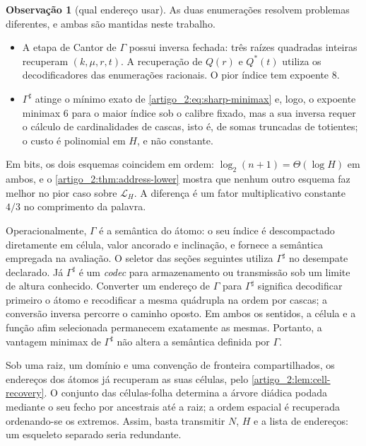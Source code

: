 \documentclass[12pt,a4paper]{article}
\theoremstyle{preciso}
\theoremstyle{definition}
\newcommand{\Library}{\mathcal{L}}
\theoremstyle{preciso}
\theoremstyle{preciso}
\theoremstyle{preciso}
\theoremstyle{preciso}
\theoremstyle{definition}
\theoremstyle{preciso}
\theoremstyle{definition}
\newtheorem{remark}[teorema]{Observação}
\theoremstyle{preciso}
\theoremstyle{preciso}
\theoremstyle{definition}
\begin{document}
\begin{remark}[qual endereço usar]\label{map:artigo_2:3.8}\label{artigo_2:rem:which-address}
As duas enumerações resolvem problemas diferentes, e ambas são mantidas neste trabalho.
\begin{itemize}[leftmargin=1.6em]
 \item A etapa de Cantor de $\Gamma$ possui inversa fechada: três raízes quadradas inteiras recuperam $(k,\mu,r,t)$. A recuperação de $Q(r)$ e $Q^*(t)$ utiliza os decodificadores das enumerações racionais. O pior índice tem expoente $8$.
 \item $\Gamma^\sharp$ atinge o mínimo exato de \eqref{artigo_2:eq:sharp-minimax} e, logo, o expoente minimax $6$ para o maior índice sob o calibre fixado, mas a sua inversa requer o cálculo de cardinalidades de cascas, isto é, de somas truncadas de totientes; o custo é polinomial em $H$, e não constante.
\end{itemize}
Em bits, os dois esquemas coincidem em ordem: $\log_2(n+1)=\Theta(\log H)$ em ambos, e o \cref{artigo_2:thm:address-lower} mostra que nenhum outro esquema faz melhor no pior caso sobre $\Library_H$. A diferença é um fator multiplicativo constante $4/3$ no comprimento da palavra.
\end{remark}

Operacionalmente, $\Gamma$ é a semântica do átomo: o seu índice é descompactado
diretamente em célula, valor ancorado e inclinação, e fornece a semântica empregada na avaliação. O seletor das seções seguintes utiliza $\Gamma^\sharp$ no desempate declarado. Já $\Gamma^\sharp$ é um
\emph{codec} para armazenamento ou transmissão sob um limite de altura
conhecido. Converter um endereço de $\Gamma$ para $\Gamma^\sharp$ significa
decodificar primeiro o átomo e recodificar a mesma quádrupla na ordem por
cascas; a conversão inversa percorre o caminho oposto. Em ambos os sentidos, a
célula e a função afim selecionada permanecem exatamente as mesmas. Portanto,
a vantagem minimax de $\Gamma^\sharp$ não altera a semântica definida por
$\Gamma$.

Sob uma raiz, um domínio e uma convenção de fronteira compartilhados, os
endereços dos átomos já recuperam as suas células, pelo
\cref{artigo_2:lem:cell-recovery}. O conjunto das células-folha determina a árvore
diádica podada mediante o seu fecho por ancestrais até a raiz; a ordem espacial é
recuperada ordenando-se os extremos. Assim, basta transmitir $N$, $H$ e a lista
de endereços: um esqueleto separado seria redundante.
\end{document}
